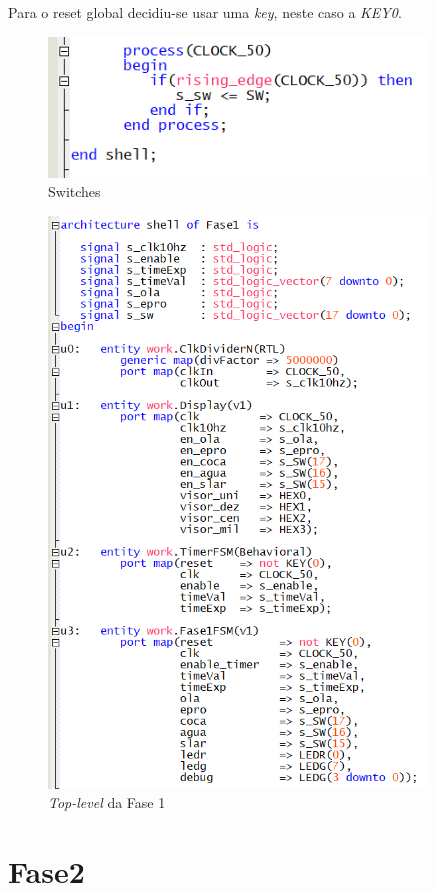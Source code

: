 \documentclass{report}
\begin{document}
Para o reset global decidiu-se usar uma \textit{key}, neste caso a \textit{KEY0}.

\begin{figure}[H]
    \centering
    \includegraphics[width = 10cm]{Fase1TopLevelSWs.png}
    \caption{Switches}
    \label{fig:Switches}
\end{figure}

\begin{figure}[H]
    \centering
    \includegraphics[width = 10cm]{Fase1TopLevelSHELL.png}
    \caption{\textit{Top-level} da Fase 1}
    \label{fig:TLF1}
\end{figure}

\newpage

\section{Fase2}
\end{document}
